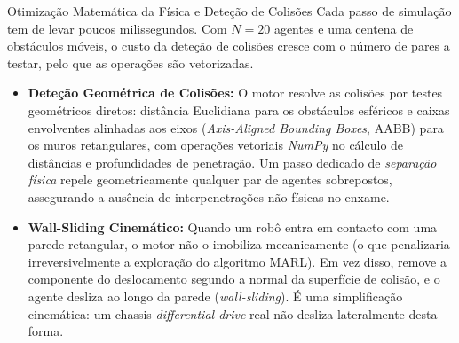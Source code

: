 \documentclass[12pt,reqno, twoside]{amsbook}
\makeatletter
\def\subsection{\@startsection{subsection}{2}%
      \z@{.5\linespacing\@plus.7\linespacing}{.25\linespacing}%
      {\normalfont\bfseries\flushleft}}
\theoremstyle{plain}
\numberwithin{equation}{chapter}
\numberwithin{section}{chapter}
\numberwithin{table}{chapter}
\numberwithin{figure}{chapter}
\makeatother
\begin{document}
\subsection{Otimização Matemática da Física e Deteção de Colisões}
\label{sec:eng_fisica}
Cada passo de simulação tem de levar poucos milissegundos. Com $N=20$ agentes e uma centena de obstáculos móveis, o custo da deteção de colisões cresce com o número de pares a testar, pelo que as operações são vetorizadas.
\begin{itemize}
    \item \textbf{Deteção Geométrica de Colisões:} O motor resolve as colisões por testes geométricos diretos: distância Euclidiana para os obstáculos esféricos e caixas envolventes alinhadas aos eixos (\textit{Axis-Aligned Bounding Boxes}, AABB) para os muros retangulares, com operações vetoriais \emph{NumPy} no cálculo de distâncias e profundidades de penetração. Um passo dedicado de \emph{separação física} repele geometricamente qualquer par de agentes sobrepostos, assegurando a ausência de interpenetrações não-físicas no enxame.
    \item \textbf{Wall-Sliding Cinemático:} Quando um robô entra em contacto com uma parede retangular, o motor não o imobiliza mecanicamente (o que penalizaria irreversivelmente a exploração do algoritmo MARL). Em vez disso, remove a componente do deslocamento segundo a normal da superfície de colisão, e o agente desliza ao longo da parede (\textit{wall-sliding}). É uma simplificação cinemática: um chassis \textit{differential-drive} real não desliza lateralmente desta forma.
\end{itemize}
\end{document}

